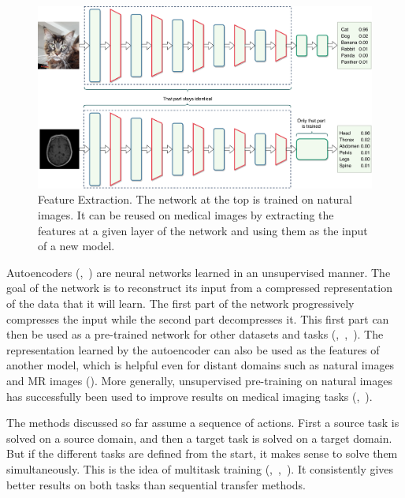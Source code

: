\begin{figure}[htbp]
    \centering
	\includegraphics[width=\textwidth]{img_transfer/feature_extraction}
    \caption[Feature Extraction]{Feature Extraction. The network at the top is trained on natural images. It can be reused on medical images by extracting the features at a given layer of the network and using them as the input of a new model.}
    \label{fig:feature_extraction}
\end{figure}

Autoencoders (\textcite{ballard1987},~\textcite{bengio2007NIPS}) are neural networks learned in an unsupervised manner. The goal of the network is to reconstruct its input from a compressed representation of the data that it will learn. The first part of the network progressively compresses the input while the second part decompresses it. This first part can then be used as a pre-trained network for other datasets and tasks (\textcite{bengio2007NIPS},~\textcite{vincent2008ICML},~\textcite{erhan2010JMLR}). The representation learned by the autoencoder can also be used as the features of another model, which is helpful even for distant domains such as natural images and MR images (\textcite{gupta2013ICML}). More generally, unsupervised pre-training on natural images has successfully been used to improve results on medical imaging tasks (\textcite{schlegl2014MICCAI},~\textcite{hofmanninger2015CVPR}).

The methods discussed so far assume a sequence of actions. First a source task is solved on a source domain, and then a target task is solved on a target domain. But if the different tasks are defined from the start, it makes sense to solve them simultaneously. This is the idea of multitask training (\textcite{caruana1995NIPS},~\textcite{caruana1997},~\textcite{collobert2008ICML}). It consistently gives better results on both tasks than sequential transfer methods. 

